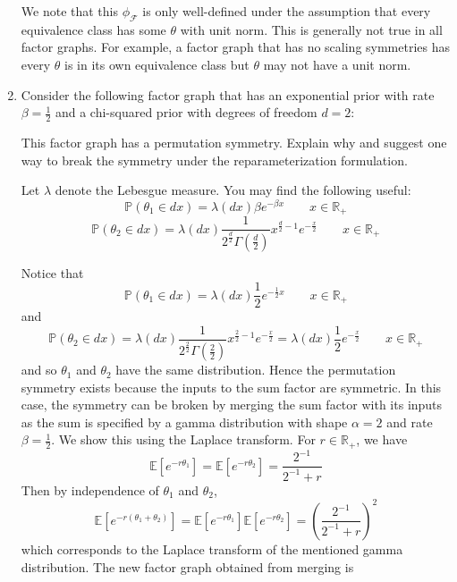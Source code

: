 \begin{enumerate}
\begin{solution}
We note that this $\phi_\mathcal{F}$ is only well-defined under the assumption that every equivalence class has some $\theta$ with unit norm. This is generally not true in all factor graphs. For example, a factor graph that has no scaling symmetries has every $\theta$ is in its own equivalence class but $\theta$ may not have a unit norm.
\end{solution}
\fi

\newpage

\item
Consider the following factor graph that has an exponential prior with rate $\beta = \frac{1}{2}$ and a chi-squared prior with degrees of freedom $d=2$:

\begin{figure}[h]
\begin{center}
\end{center}
\end{figure}

This factor graph has a permutation symmetry. Explain why and suggest one way to break the symmetry under the reparameterization formulation.

Let $\lambda$ denote the Lebesgue measure. You may find the following useful:
\[
\mathbb{P}(\theta_1\in dx) = \lambda(dx)\beta e^{-\beta x} \qquad x\in\mathbb{R}_+
\]
\[
\mathbb{P}(\theta_2\in dx) = \lambda(dx)\frac{1}{2^{\frac{d}{2}}\Gamma\left(\frac{d}{2}\right)}x^{\frac{d}{2}-1}e^{-\frac{x}{2}} \qquad x\in\mathbb{R}_+
\]

\begin{solution}
Notice that
\[
\mathbb{P}(\theta_1\in dx) = \lambda(dx)\frac{1}{2}e^{-\frac{1}{2}x} \qquad x\in\mathbb{R}_+
\]
and
\[
\mathbb{P}(\theta_2\in dx) = \lambda(dx)\frac{1}{2^{\frac{2}{2}}\Gamma\left(\frac{2}{2}\right)}x^{\frac{2}{2}-1}e^{-\frac{x}{2}} = \lambda(dx)\frac{1}{2}e^{-\frac{x}{2}} \qquad x\in\mathbb{R}_+
\]
and so $\theta_1$ and $\theta_2$ have the same distribution. Hence the permutation symmetry exists because the inputs to the sum factor are symmetric. In this case, the symmetry can be broken by merging the sum factor with its inputs as the sum is specified by a gamma distribution with shape $\alpha=2$ and rate $\beta=\frac{1}{2}$. We show this using the Laplace transform. For $r\in\mathbb{R}_+$, we have
\[
\mathbb{E}[e^{-r\theta_1}] = \mathbb{E}[e^{-r\theta_2}] = \frac{2^{-1}}{2^{-1}+r}
\]
Then by independence of $\theta_1$ and $\theta_2$,
\[
\mathbb{E}[e^{-r(\theta_1+\theta_2)}] = \mathbb{E}[e^{-r\theta_1}]\mathbb{E}[e^{-r\theta_2}] = \left(\frac{2^{-1}}{2^{-1}+r}\right)^2
\]
which corresponds to the Laplace transform of the mentioned gamma distribution. The new factor graph obtained from merging is


\end{solution}
\end{enumerate}
